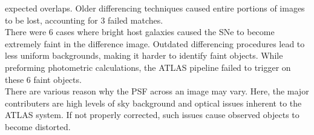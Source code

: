 expected overlaps. Older differencing techniques caused entire portions 
of images to be lost, accounting for 3 failed matches.\\
%

\indent There were 6 cases where bright host galaxies caused the SNe to become extremely 
faint in the difference image. Outdated differencing procedures lead to less 
uniform backgrounds, making it harder to identify faint objects.  %
While preforming photometric calculations, the ATLAS pipeline failed to trigger 
on these 6 faint objects.\\
%
%
\indent There are various reason why the PSF across an image may vary.
Here, the major contributers are high levels of sky background and optical 
issues inherent to the ATLAS system. 
If not properly corrected, such issues cause observed objects to become distorted.  
